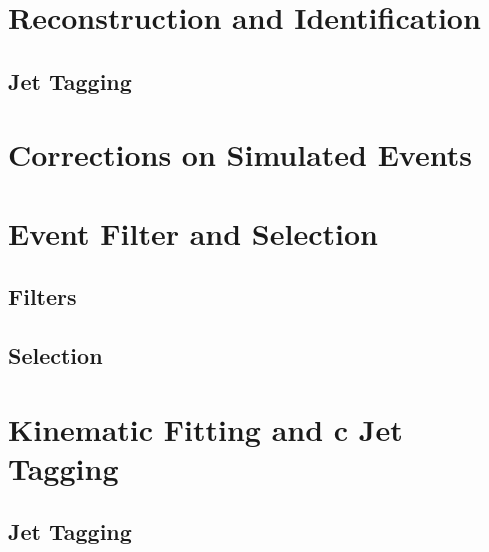 \chapter{Reconstruction and Identification}
\label{c:secReco}



\section{ Jet Tagging}
\label{s:bTag}


\chapter{Corrections on Simulated Events}
\label{s:secMCSF}


\chapter{Event Filter and Selection}
\section{Filters}
\label{s:secFilters}


\section{Selection}
\label{s:secEvtSel}


\chapter{Kinematic Fitting and \rm{c} Jet Tagging}
\label{s:KinFit}


\section{ Jet Tagging}
\label{s:cTag}


